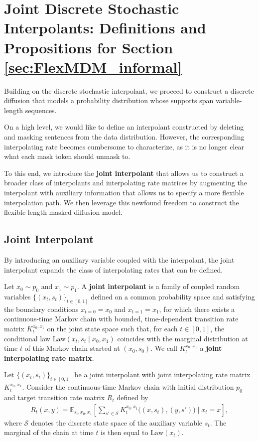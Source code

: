 \section{Joint Discrete Stochastic Interpolants: Definitions and Propositions for Section \ref{sec:FlexMDM_informal}} \label{sec:app-joint-interpolant-flex-mdm}
Building on the discrete stochastic interpolant, we proceed to construct a discrete diffusion that models a probability distribution whose supports span variable-length sequences.

On a high level, we would like to define an interpolant constructed by deleting and masking sentences from the data distribution. However, the corresponding interpolating rate becomes cumbersome to characterize, as it is no longer clear what each mask token should unmask to.

To this end, we introduce the \textbf{joint interpolant} that allows us to construct a broader class of interpolants and interpolating rate matrices by augmenting the interpolant with auxiliary information that allows us to specify a more flexible interpolation path. We then leverage this newfound freedom to construct the flexible-length masked diffusion model.

\subsection{Joint Interpolant}
By introducing an auxiliary variable coupled with the interpolant, the joint interpolant expands the class of interpolating rates that can be defined.
\begin{appdefinition}  
Let \( x_0 \sim p_0 \) and \( x_1 \sim p_1 \). A \textbf{joint interpolant} is a family of coupled random variables \(\{(x_t, s_t)\}_{t \in [0,1]}\) defined on a common probability space and satisfying the boundary conditions \( x_{t=0} = x_0 \) and \( x_{t=1} = x_1 \), for which there exists a continuous-time Markov chain with bounded, time-dependent transition rate matrix \( K_t^{x_0, x_1} \) on the joint state space such that, for each \( t \in [0,1] \), the conditional law \(\mathrm{Law}(x_t, s_t \mid x_0, x_1)\) coincides with the marginal distribution at time \( t \) of this Markov chain started at \((x_0, s_0)\). We call \( K_t^{x_0, x_1} \) a \textbf{joint interpolating rate matrix}.
\end{appdefinition}

\begin{appprop} \label{prop:joint-target-rate}
Let \(\{(x_t, s_t)\}_{t \in [0,1]}\) be a joint interpolant with joint interpolating rate matrix \(K_t^{x_0, x_1}\). Consider the continuous-time Markov chain with initial distribution \(p_0\) and target transition rate matrix \(R_t\) defined by
\begin{align}
    R_t(x, y) = \mathbb{E}_{s_t,x_0,x_1}\left[ \sum_{s' \in \mathcal{S}} K_t^{x_0, x_1} \big( (x, s_t), (y, s') \big) \mid x_t = x \right],
\end{align}
where \(\mathcal{S}\) denotes the discrete state space of the auxiliary variable \(s_t\). The marginal of the chain at time \(t\) is then equal to \(\mathrm{Law}(x_t)\).
\end{appprop}

